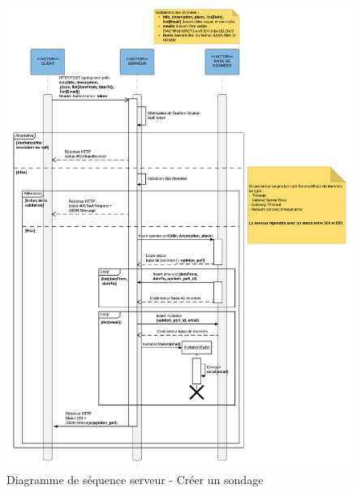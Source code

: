 \documentclass[titlepage]{report}
\begin{document}
\begin{figure}[h]
	\caption{Diagramme de séquence serveur - Créer un sondage}
	\label{annexe_diagramme_sequence_serveur_creerSondage}
	\centering
	\includegraphics[width=\textwidth]{figures/diagrammes/sequence_serveur_creerSondage.png}
\end{figure}
\end{document}
